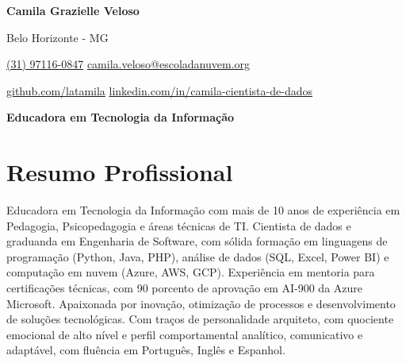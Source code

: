 \documentclass[a4paper,10pt]{article}
\begin{document}

\noindent
\begin{minipage}[t]{0.5\textwidth}
\textbf{\Large Camila Grazielle Veloso}

\vspace{0.4em}

\end{minipage}%
\begin{minipage}[t]{0.5\textwidth}
\raggedleft

Belo Horizonte - MG

{\color{blue}} \href{tel:+5567998748431}{(31) 97116-0847}
{\color{blue}} \href{mailto:camila.veloso@escoladanuvem.org}{camila.veloso@escoladanuvem.org}

\vspace{0.2em}
 \quad
{\color{blue}} \href{https://github.com/latamila}{github.com/latamila}
{\color{blue}} \href{https://www.linkedin.com/in/camila-cientista-de-dados/}{ linkedin.com/in/camila-cientista-de-dados} \\
\end{minipage}

\vspace{1em}

\begin{center}
    \textbf{\Large Educadora em Tecnologia da Informação}
\end{center}
\vspace{0.5em}

\section*{Resumo Profissional}

\vspace{0.6em}

Educadora em Tecnologia da Informação com mais de 10 anos de experiência em Pedagogia, Psicopedagogia e áreas técnicas de TI. Cientista de dados e graduanda em Engenharia de Software, com sólida formação em linguagens de programação (Python, Java, PHP), análise de dados (SQL, Excel, Power BI) e computação em nuvem (Azure, AWS, GCP). Experiência em mentoria para certificações técnicas, com 90 porcento de aprovação em AI-900 da Azure Microsoft. Apaixonada por inovação, otimização de processos e desenvolvimento de soluções tecnológicas. Com traços de personalidade arquiteto, com quociente emocional de alto nível e perfil comportamental analítico, comunicativo e adaptável, com fluência em Português, Inglês e Espanhol. 
\end{document}
